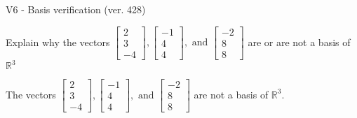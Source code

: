 \begin{exercise}
  \begin{exerciseTitle}V6 - Basis verification (ver. 428)\end{exerciseTitle}
  \begin{exerciseStatement}
    Explain why the vectors \(\left[\begin{array}{r}
2 \\
3 \\
-4
\end{array}\right] , \left[\begin{array}{r}
-1 \\
4 \\
4
\end{array}\right] , \text{ and } \left[\begin{array}{r}
-2 \\
8 \\
8
\end{array}\right]\) are or are not a basis of \(\mathbb{R}^3\)	


  \end{exerciseStatement}
  \begin{exerciseAnswer}
   The vectors \(\left[\begin{array}{r}
2 \\
3 \\
-4
\end{array}\right] , \left[\begin{array}{r}
-1 \\
4 \\
4
\end{array}\right] , \text{ and } \left[\begin{array}{r}
-2 \\
8 \\
8
\end{array}\right]\) 
  	 are not  a basis of \(\mathbb{R}^3\).
  


  \end{exerciseAnswer}
\end{exercise}